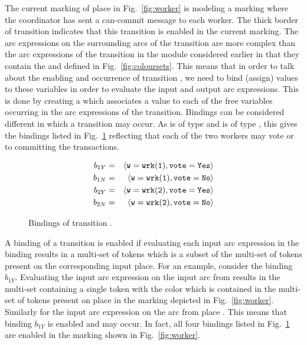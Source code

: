 The current marking of place  in
Fig.~\ref{fig:worker} is  modeling a
marking where the coordinator has sent a can-commit message to each
worker. The thick border of transition 
indicates that this transition is enabled in the current marking. The
arc expressions on the surrounding arcs of the
 transition are more complex than the arc
expressions of the  transition in the
 module considered earlier in that they contain
the   and  defined in
Fig.~\ref{fig:coloursets}. This means that in order to talk about the
enabling and occurrence of transition , we
need to bind (assign) values to these variables in order to evaluate
the input and output arc expressions. This is done by creating a
 which associates a value to each of the free
variables occurring in the arc expressions of the transition. Bindings
can be considered different  in which a transition may occur.  As
 is of type  and  is of type
, this gives the bindings listed in
Fig.~\ref{fig:bindings} reflecting that each of the two workers may
vote  or  to committing the transactions.

\begin{figure}[]
\centering
\begin{eqnarray*}
b_{1Y} & = & \langle {\tt{w}} = {\tt{wrk(1)}}, {\tt{vote}} = {\tt{Yes}} \rangle \\
b_{1N} & = & \langle {\tt{w}} = {\tt{wrk(1)}}, {\tt{vote}} = {\tt{No}} \rangle \\
b_{2Y} & = & \langle {\tt{w}} = {\tt{wrk(2)}}, {\tt{vote}} = {\tt{Yes}} \rangle \\
b_{2N} & = & \langle {\tt{w}} = {\tt{wrk(2)}}, {\tt{vote}} = {\tt{No}} \rangle
\end{eqnarray*}
\caption{Bindings of transition .}
\label{fig:bindings}
\end{figure}

A binding of a transition is enabled if evaluating each input arc
expression in the binding results in a multi-set of tokens which is a
subset of the multi-set of tokens present on the corresponding input
place. For an example, consider the binding $b_{1Y}$. Evaluating the
input arc expression  on the input arc from 
results in the multi-set containing a single token with the color
 which is contained in the multi-set of tokens present
on place  in the marking depicted in
Fig.~\ref{fig:worker}. Similarly for the input arc expression on the
arc from place . This means that binding $b_{1Y}$
is enabled and may occur. In fact, all four bindings listed in
Fig.~\ref{fig:bindings} are enabled in the marking shown in
Fig.~\ref{fig:worker}.

